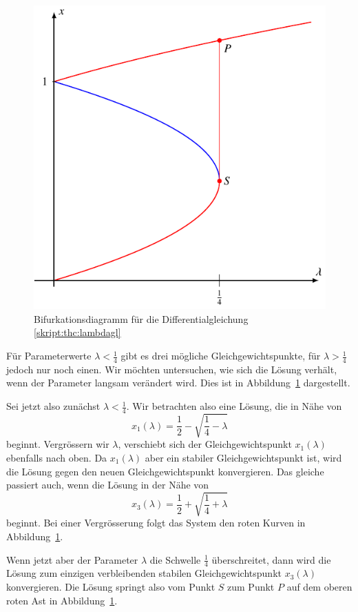 \begin{figure}
\centering
\includegraphics{chapters/4/bi.pdf}
\caption{Bifurkationsdiagramm für die Differentialgleichung
\eqref{skript:thc:lambdagl}
\label{skript:thc:bifurkation}}
\end{figure}
Für Parameterwerte $\lambda < \frac14$ gibt es drei mögliche
Gleichgewichtspunkte, für $\lambda>\frac14$ jedoch nur noch einen.
Wir möchten untersuchen, wie sich die Lösung verhält, wenn der
Parameter langsam verändert wird.
Dies ist in Abbildung~\ref{skript:thc:bifurkation} dargestellt.

Sei jetzt also zunächst $\lambda <\frac14$.
Wir betrachten also eine Lösung, die in Nähe von
\[
x_1(\lambda)=\frac12-\sqrt{\frac14-\lambda}
\]
beginnt.
Vergrössern wir $\lambda$, verschiebt sich der Gleichgewichtspunkt
$x_1(\lambda)$ ebenfalls nach oben.
Da $x_1(\lambda)$ aber ein stabiler Gleichgewichtspunkt ist, wird die
Lösung gegen den neuen Gleichgewichtspunkt konvergieren.
Das gleiche passiert auch, wenn die Lösung in der Nähe von
\[
x_3(\lambda)=\frac12+\sqrt{\frac14+\lambda}
\]
beginnt.
Bei einer Vergrösserung folgt das System den roten Kurven in
Abbildung~\ref{skript:thc:bifurkation}.

Wenn jetzt aber der Parameter $\lambda$ die Schwelle $\frac14$
überschreitet, dann wird die Lösung zum einzigen verbleibenden
stabilen Gleichgewichtspunkt $x_3(\lambda)$ konvergieren.
Die Lösung springt also vom Punkt $S$ zum Punkt $P$ auf dem oberen roten Ast
in Abbildung~\ref{skript:thc:bifurkation}.

